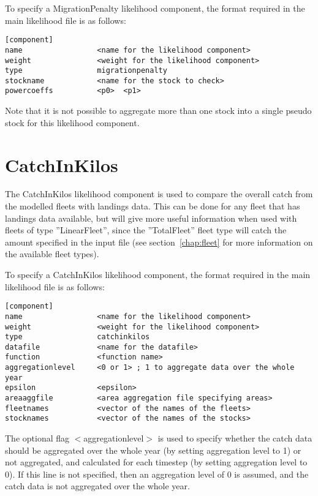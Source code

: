 \documentclass[10pt,twoside]{book}
\begin{document}
\bigskip
To specify a MigrationPenalty likelihood component, the format required in the main likelihood file is as follows:

{\small\begin{verbatim}
[component]
name                 <name for the likelihood component>
weight               <weight for the likelihood component>
type                 migrationpenalty
stockname            <name for the stock to check>
powercoeffs          <p0>  <p1>
\end{verbatim}}

Note that it is not possible to aggregate more than one stock into a single pseudo stock for this likelihood component.

\section{CatchInKilos}\label{sec:catchinkilos}
The CatchInKilos likelihood component is used to compare the overall catch from the modelled fleets with landings data.  This can be done for any fleet that has landings data available, but will give more useful information when used with fleets of type ''LinearFleet'', since the ''TotalFleet'' fleet type will catch the amount specified in the input file (see section~\ref{chap:fleet} for more information on the available fleet types).

\bigskip
To specify a CatchInKilos likelihood component, the format required in the main likelihood file is as follows:

{\small\begin{verbatim}
[component]
name                 <name for the likelihood component>
weight               <weight for the likelihood component>
type                 catchinkilos
datafile             <name for the datafile>
function             <function name>
aggregationlevel     <0 or 1> ; 1 to aggregate data over the whole year
epsilon              <epsilon>
areaaggfile          <area aggregation file specifying areas>
fleetnames           <vector of the names of the fleets>
stocknames           <vector of the names of the stocks>
\end{verbatim}}

The optional flag $<$aggregationlevel$>$ is used to specify whether the catch data should be aggregated over the whole year (by setting aggregation level to 1) or not aggregated, and calculated for each timestep (by setting aggregation level to 0).  If this line is not specified, then an aggregation level of 0 is assumed, and the catch data is not aggregated over the whole year.
\end{document}
